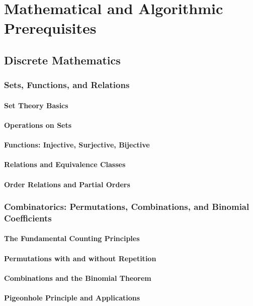 \chapter{Mathematical and Algorithmic Prerequisites}
\section{Discrete Mathematics}
\subsection{Sets, Functions, and Relations}
\subsubsection{Set Theory Basics}
\subsubsection{Operations on Sets}
\subsubsection{Functions: Injective, Surjective, Bijective}
\subsubsection{Relations and Equivalence Classes}
\subsubsection{Order Relations and Partial Orders}

\subsection{Combinatorics: Permutations, Combinations, and Binomial Coefficients}
\subsubsection{The Fundamental Counting Principles}
\subsubsection{Permutations with and without Repetition}
\subsubsection{Combinations and the Binomial Theorem}
\subsubsection{Pigeonhole Principle and Applications}
